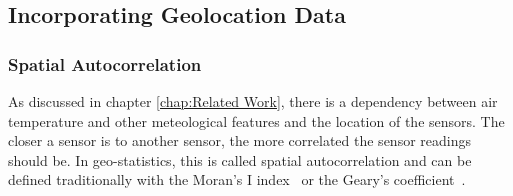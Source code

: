\subsection{Incorporating Geolocation Data}
\label{sec:geolocation}

\subsubsection{Spatial Autocorrelation}

As discussed in chapter \ref{chap:Related Work}, there is a dependency between air temperature and other meteological features and the location of the sensors. The closer a sensor is to another sensor, the more correlated the sensor readings should be.
In geo-statistics, this is called spatial autocorrelation and can be defined traditionally with the Moran's I index~\cite{moran1948interpretation} or the Geary's coefficient~\cite{geary1954contiguity}. 

